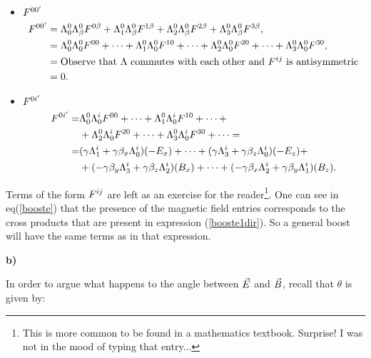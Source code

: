\begin{itemize}
	\item $F^{00' }$
	\begin{equation}
		\begin{split}
			F^{00' } &= \Lambda^{0}_{0} \Lambda^{0}_{\beta}F^{0\beta } + \Lambda^{0}_{1} \Lambda^{0}_{\beta}F^{1\beta } + \Lambda^{0}_{2} \Lambda^{0}_{\beta}F^{2\beta } + \Lambda^{0}_{3} \Lambda^{0}_{\beta}F^{3\beta },\\
			&= \Lambda^{0}_{0} \Lambda^{0}_{0}F^{00 } + \cdots + \Lambda^{0}_{1} \Lambda^{0}_{0}F^{10 } + \cdots + \Lambda^{0}_{2} \Lambda^{0}_{0}F^{20 } + \cdots + \Lambda^{0}_{3} \Lambda^{0}_{0}F^{30 },\\
			& = \text{Observe that $\Lambda$ commutes with each other and $F^{ij }$ is antisymmetric} \\
			&= 0.
		\end{split}
	\end{equation}
	
	\item $F^{0i' }$
	\begin{equation}\label{booste}
		\begin{split}
			F^{0i' } =& \Lambda^{0}_{0} \Lambda^{i}_{0} F^{00 }+\cdots + \Lambda^{0}_{1} \Lambda^{i}_{0} F^{10 } + \cdots +\\
			&+ \Lambda^{0}_{2} \Lambda^{i}_{0} F^{20 } + \cdots + \Lambda^{0}_{3} \Lambda^{i}_{0} F^{30 } + \cdots=  \\
			=& (\gamma \Lambda^{i}_{1} + \gamma \beta_{x} \Lambda^{i}_{0}) (-E_{x}) + \cdots + (\gamma \Lambda^{i}_{3} + \gamma \beta_{z} \Lambda^{i}_{0}) (-E_{z} ) +\\
			&+ (-\gamma\beta_{y} \Lambda^{i}_{3} + \gamma \beta_{z} \Lambda^{i}_{2}) (B_{x}) + \cdots + (-\gamma\beta_{x} \Lambda^{i}_{2} + \gamma \beta_{y} \Lambda^{i}_{1}) (B_{z}).
		\end{split}
	\end{equation}
\end{itemize}

Terms of the form $F^{ij }$ are left as an exercise for the reader\footnote{This is more common to be found in a mathematics textbook. Surprise! I was not in the mood of typing that entry...}. One can see in eq(\ref{booste}) that the presence of the magnetic field entries corresponds to the cross products that are present in expression (\ref{booste1dir}). So a general boost will have the same terms as in that expression.

\textbf{b)}

In order to argue what happens to the angle between $\vec{E}$ and $\vec{B}$, recall that $\theta$ is given by:

